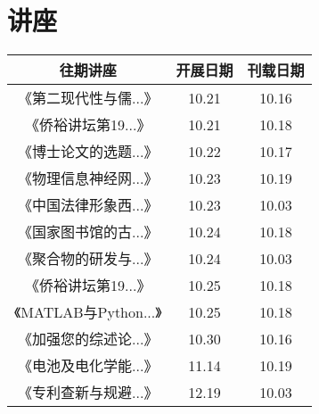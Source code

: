 \section{讲座}
\begin{tabular}{|c|c|c|}
    \hline
    往期讲座 & 开展日期 & 刊载日期\\
    \hline\hline《第二现代性与儒...》 & 10.21 & 10.16 \\
《侨裕讲坛第19...》 & 10.21 & 10.18 \\
《博士论文的选题...》 & 10.22 & 10.17 \\
《物理信息神经网...》 & 10.23 & 10.19 \\
《中国法律形象西...》 & 10.23 & 10.03 \\
《国家图书馆的古...》 & 10.24 & 10.18 \\
《聚合物的研发与...》 & 10.24 & 10.03 \\
《侨裕讲坛第19...》 & 10.25 & 10.18 \\
《MATLAB与Python...》 & 10.25 & 10.18 \\
《加强您的综述论...》 & 10.30 & 10.16 \\
《电池及电化学能...》 & 11.14 & 10.19 \\
《专利查新与规避...》 & 12.19 & 10.03 \\
    \hline
\end{tabular}